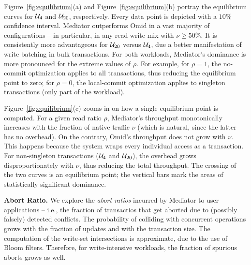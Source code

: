 Figure~\ref{fig:equilibrium}(a) and Figure~\ref{fig:equilibrium}(b) portray the equilibrium curves 
for $\mathcal{U}_{4}$ and $\mathcal{U}_{20}$, respectively. Every data point is depicted with a $10\%$
confidence interval. Mediator outperforms Omid in a vast majority of configurations -- in particular, 
in any read-write mix with $\nu \geq 50\%$. It is consistently more advantageous for $\mathcal{U}_{20}$ 
versus $\mathcal{U}_{4}$, due a better manifestation of write batching in bulk transactions. For both workloads, 
Mediator's dominance is more pronounced for the extreme values of $\rho$. For example, for $\rho=1$, 
the no-commit optimization applies to all transactions, thus reducing the equilibrium point to zero; 
for $\rho=0$, the local-commit optimization applies to singleton transactions
(only part of the workload).


Figure~\ref{fig:equilibrium}(c) zooms in on how a single equilibrium point is computed.
For a given read ratio $\rho$, Mediator's throughput monotonically increases with the 
fraction of native traffic $\nu$ (which is natural, since the latter has no overhead). 
On the contrary, Omid's throughput does not grow with $\nu$. This happens because 
the system wraps every individual access as a transaction. For non-singleton 
transactions ($\mathcal{U}_{4}$ and $\mathcal{U}_{20}$), the overhead grows disproportionately 
with $\nu$, thus reducing the total throughput. The crossing of the two curves is an equilibrium 
point; the vertical bars mark the areas of statistically significant dominance. 


{\bf Abort Ratio.} 
We explore the {\em abort ratios\/} incurred by Mediator to user applications --
i.e., the fraction of transactios that get aborted due to (possibly falsely) 	
detected conflicts.  The probability of colliding with concurrent operations grows 
with the fraction of updates and with the transaction size. The 
computation of the write-set intersections is approximate, due to
the use of Bloom filters. Therefore, for write-intensive workloads, 
the fraction of spurious aborts grows as well.  

